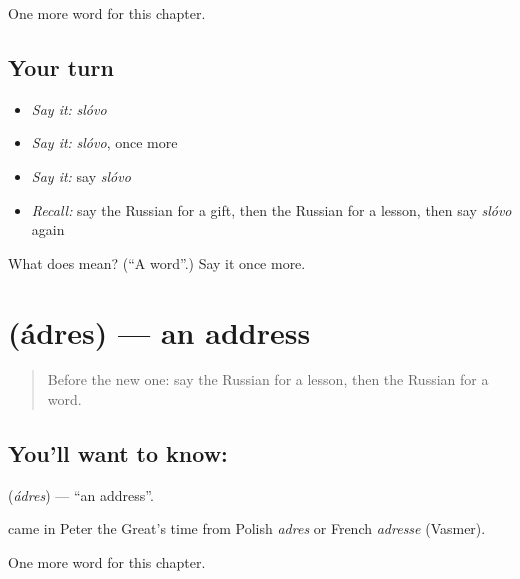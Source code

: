 \begin{grammarlens}[title={What you've built}]
One more word for this chapter.
\end{grammarlens}

\subsection*{Your turn}
\begin{itemize}
\raggedright
  \item \emph{Say it:} \emph{slóvo}
  \item \emph{Say it:} \emph{slóvo}, once more
  \item \emph{Say it:} say \emph{slóvo}
  \item \emph{Recall:} say the Russian for a gift, then the Russian for a lesson, then say \emph{slóvo} again
\end{itemize}

\begin{tcolorbox}[breakable,colback=teal!4,colframe=teal!35!black,title={Before you move on}]
What does  mean? (\textquotedblleft{}A word\textquotedblright{}.) Say it once more.
\end{tcolorbox}
\section[\texorpdfstring{\ru{адрес} (ádres)}{адрес (ádres)}]{ (ádres) — an address}

\label{lesson:RU-C54-address}



\begin{quote}
Before the new one: say the Russian for a lesson, then the Russian for a word.
\end{quote}

\subsection*{You'll want to know: }
\textbf{} (\emph{ádres}) — \textquotedblleft{}an address\textquotedblright{}.

\begin{cousinweb}
\textbf{} came in Peter the Great's time from Polish \emph{adres} or French \emph{adresse} (Vasmer).
\end{cousinweb}

\begin{grammarlens}[title={What you've built}]
One more word for this chapter.
\end{grammarlens}

